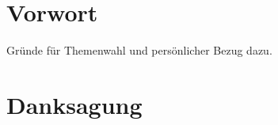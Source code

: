 \documentclass[12pt]{scrartcl}
\begin{document}
\section*{Vorwort}
\label{sec:vorwort}
Gründe für Themenwahl und persönlicher Bezug dazu.

\newpage
	\tableofcontents
\newpage

\section*{Danksagung}
\label{sec:danksagung}

	
	
	
	
	
	
	
	

\listoffigures
\printbibliography
	
\end{document}

